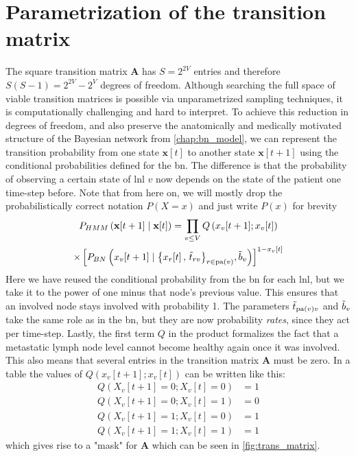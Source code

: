 \documentclass[\relativeRoot/main.tex]{subfiles}
\begin{document}
\section{Parametrization of the transition matrix}
\label{sec:unilateral:parametrization}

The square transition matrix $\mathbf{A}$ has $S = 2^{2V}$ entries and therefore $S(S-1)=2^{2V}-2^V$ degrees of freedom. Although searching the full space of viable transition matrices is possible via unparametrized sampling techniques, it is computationally challenging and hard to interpret. To achieve this reduction in degrees of freedom, and also preserve the anatomically and medically motivated structure of the Bayesian network from \cref{chap:bn_model}, we can represent the transition probability from one state $\mathbf{x}[t]$ to another state $\mathbf{x}[t+1]$ using the conditional probabilities defined for the \gls{bn}. The difference is that the probability of observing a certain state of \gls{lnl} $v$ now depends on the state of the patient one time-step before. Note that from here on, we will mostly drop the probabilistically correct notation $P(X=x)$ and just write $P(x)$ for brevity
%
\begin{multline} \label{eq:unilateral:parametrization:one_step}
    P_{HMM} \left( \mathbf{x}[t+1] \mid \mathbf{x}[t] \right)
    = \prod_{v \leq V}{Q \left( x_v[t+1]; x_v[t] \right)} \\ 
    \times \left[ P_{BN} \left( x_v[t+1] \mid \big\{ x_r[t] \, , \, \Tilde{t}_{rv} \big\}_{r \in \operatorname{pa}(v)}, \Tilde{b}_v \right) \right]^{1-x_v[t]}
\end{multline}
%
Here we have reused the conditional probability from the \gls{bn} for each \gls{lnl}, but we take it to the power of one minus that node’s previous value. This ensures that an involved node stays involved with probability 1. The parameters $\Tilde{t}_{\operatorname{pa}(v)v}$ and $\Tilde{b}_v$ take the same role as in the \gls{bn}, but they are now probability \emph{rates}, since they act per time-step. Lastly, the first term $Q$ in the product formalizes the fact that a metastatic lymph node level cannot become healthy again once it was involved. This also means that several entries in the transition matrix $\mathbf{A}$ must be zero. In a table the values of $Q\left( x_v[t+1]; x_v[t] \right)$ can be written like this:
%
\begin{equation}
    \begin{aligned}
        Q \left( X_v[t+1] = 0; X_v[t] = 0 \right) &= 1 \\
        Q \left( X_v[t+1] = 0; X_v[t] = 1 \right) &= 0 \\
        Q \left( X_v[t+1] = 1; X_v[t] = 0 \right) &= 1 \\
        Q \left( X_v[t+1] = 1; X_v[t] = 1 \right) &= 1 
    \end{aligned}
\end{equation}
%
which gives rise to a "mask" for $\mathbf{A}$ which can be seen in \cref{fig:trans_matrix}.
\end{document}
